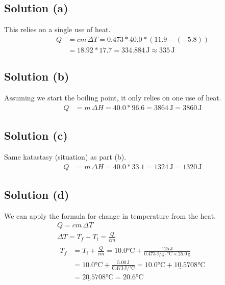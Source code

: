 \documentclass[10pt]{article}
\newcommand{\U}[1]{\underline{#1}}
\begin{document}
        \subsection{Solution (a)}
            This relies on a single use of heat.
            \begin{align}
                Q   &=  cm\,\Delta T
                    =   0.473 * 40.0 * (11.9 - (-5.8))\\
                    &=  18.92 * 17.7
                    =   334.884\,\unit{\joule}
                    \approx \boxed{335\,\unit{\joule}}
            \end{align}

        \subsection{Solution (b)}
            Assuming we start the boiling point, it only relies on one use of heat.
            \begin{align}
                Q   &=  m\,\Delta H
                    =   40.0 * 96.6
                    =   3864\,\unit{\joule}
                    =   \boxed{3860\,\unit{\joule}}
            \end{align}

        \subsection{Solution (c)}
            Same katastasy (situation) as part (b).
            \begin{align}
                Q   &=  m\,\Delta H
                    =   40.0 * 33.1
                    =   1324\,\unit{\joule}
                    =   \boxed{1320\,\unit{\joule}}
            \end{align}

        \subsection{Solution (d)}
            We can apply the formula for change in temperature from the heat.
            \begin{gather}
                Q   =   cm\,\Delta T\\
                \Delta T    =   T_f - T_i
                    =   \frac{Q}{cm}\\
                \begin{align}
                    T_f &=  T_i + \frac{Q}{cm}
                        =   10.0\unit{\celsius} + \frac{125\,\unit{\joule}}{0.473\,\unit{\joule/\gram\cdot\celsius} \times 25.0\,\unit{\gram}}\\
                        &=  10.0\unit{\celsius} + \frac{5.00\,\unit{\joule}}{0.473\,\unit{\joule/\celsius}}
                        =   10.0\unit{\celsius} + \underline{10.5}708\unit{\celsius}\\
                        &=  \U{20.5}708\unit{\celsius}
                        =   \boxed{20.6\unit{\celsius}}
                \end{align}
            \end{gather}
\end{document}
